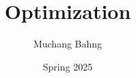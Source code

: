 \documentclass{article}
\begin{document}
\title{Optimization}
\author{Muchang Bahng}
\date{Spring 2025}

\maketitle
\tableofcontents
\pagebreak

 










\end{document}
